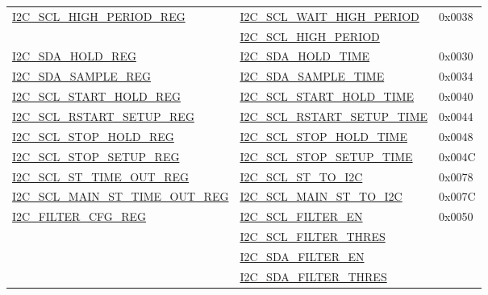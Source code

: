 \documentclass[main\_\_CN.tex]{subfiles}
\begin{document}
\begin{longtable}{ | p{6cm} | p{7cm} | p{2cm} | }
\hyperref[regdesc:I2CSCLHIGHPERIODREG]{I2C\_SCL\_HIGH\_PERIOD\_REG} & \hyperref[fielddesc:I2CSCLWAITHIGHPERIOD]{I2C\_SCL\_WAIT\_HIGH\_PERIOD} & 0x0038  \\\cline{2-2}
& \hyperref[fielddesc:I2CSCLHIGHPERIOD]{I2C\_SCL\_HIGH\_PERIOD}& \\ \hline

\hyperref[regdesc:I2CSDAHOLDREG]{I2C\_SDA\_HOLD\_REG} & \hyperref[fielddesc:I2CSDAHOLDTIME]{I2C\_SDA\_HOLD\_TIME} & 0x0030  \\\hline
\hyperref[regdesc:I2CSDASAMPLEREG]{I2C\_SDA\_SAMPLE\_REG} & \hyperref[fielddesc:I2CSDASAMPLETIME]{I2C\_SDA\_SAMPLE\_TIME} & 0x0034  \\ \hline

\hyperref[regdesc:I2CSCLSTARTHOLDREG]{I2C\_SCL\_START\_HOLD\_REG} & \hyperref[fielddesc:I2CSCLSTARTHOLDTIME]{I2C\_SCL\_START\_HOLD\_TIME} & 0x0040  \\ \hline
\hyperref[regdesc:I2CSCLRSTARTSETUPREG]{I2C\_SCL\_RSTART\_SETUP\_REG} & \hyperref[fielddesc:I2CSCLRSTARTSETUPTIME]{I2C\_SCL\_RSTART\_SETUP\_TIME} & 0x0044  \\ \hline

\hyperref[regdesc:I2CSCLSTOPHOLDREG]{I2C\_SCL\_STOP\_HOLD\_REG} & \hyperref[fielddesc:I2CSCLSTOPHOLDTIME]{I2C\_SCL\_STOP\_HOLD\_TIME} & 0x0048  \\ \hline
\hyperref[regdesc:I2CSCLSTOPSETUPREG]{I2C\_SCL\_STOP\_SETUP\_REG} & \hyperref[fielddesc:I2CSCLSTOPSETUPTIME]{I2C\_SCL\_STOP\_SETUP\_TIME} & 0x004C  \\ \hline

\hyperref[regdesc:I2CSCLSTTIMEOUTREG]{I2C\_SCL\_ST\_TIME\_OUT\_REG}& \hyperref[fielddesc:I2CSCLSTTOI2C]{I2C\_SCL\_ST\_TO\_I2C} & 0x0078\\ \hline
\hyperref[regdesc:I2CSCLMAINSTTIMEOUTREG]{I2C\_SCL\_MAIN\_ST\_TIME\_OUT\_REG}& \hyperref[fielddesc:I2CSCLMAINSTTOI2C]{I2C\_SCL\_MAIN\_ST\_TO\_I2C} & 0x007C\\ \hline


\hyperref[regdesc:I2CFILTERCFGREG]{I2C\_FILTER\_CFG\_REG} & {\hyperref[fielddesc:I2CSCLFILTEREN]{I2C\_SCL\_FILTER\_EN}} & 0x0050  \\\cline{2-2}
& {\hyperref[fielddesc:I2CSCLFILTERTHRES]{I2C\_SCL\_FILTER\_THRES}}& \\\cline{2-2}
& {\hyperref[fielddesc:I2CSDAFILTEREN]{I2C\_SDA\_FILTER\_EN}} &  \\\cline{2-2}
& {\hyperref[fielddesc:I2CSDAFILTERTHRES]{I2C\_SDA\_FILTER\_THRES}} & \\ \hline
\end{longtable}
\end{document}

